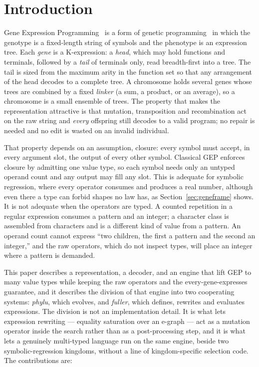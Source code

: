 \documentclass[sigconf,nonacm]{acmart}
\begin{document}
\maketitle

\section{Introduction}
\label{sec:intro}

Gene Expression Programming~\cite{ferreira2001gep} is a form of genetic
programming~\cite{koza1992gp} in which the genotype is a fixed-length string of
symbols and the phenotype is an expression tree. Each \emph{gene} is a
K-expression: a \emph{head}, which may hold functions and terminals, followed by
a \emph{tail} of terminals only, read breadth-first into a tree. The tail is
sized from the maximum arity in the function set so that any arrangement of the
head decodes to a complete tree. A chromosome holds several genes whose trees are
combined by a fixed \emph{linker} (a sum, a product, or an average), so a
chromosome is a small ensemble of trees. The property that makes the
representation attractive is that mutation, transposition and recombination act
on the raw string and \emph{every} offspring still decodes to a valid program; no
repair is needed and no edit is wasted on an invalid individual.

That property depends on an assumption, closure: every symbol must accept, in
every argument slot, the output of every other symbol. Classical GEP enforces
closure by admitting one value type, so each symbol needs only an untyped operand
count and any output may fill any slot. This is adequate for symbolic regression,
where every operator consumes and produces a real number, although even there a
type can forbid shapes no law has, as Section~\ref{sec:geneframe} shows. It is
not adequate when the operators are typed. A counted repetition in a regular expression consumes a
pattern and an integer; a character class is assembled from characters and is a
different kind of value from a pattern. An operand count cannot express ``two
children, the first a pattern and the second an integer,'' and the raw operators,
which do not inspect types, will place an integer where a pattern is demanded.

This paper describes a representation, a decoder, and an engine that lift GEP to
many value types while keeping the raw operators and the every-gene-expresses
guarantee, and it describes the division of that engine into two cooperating
systems: \emph{phylu}, which evolves, and \emph{fuller}, which defines,
rewrites and evaluates expressions. The division is not an implementation detail.
It is what lets expression rewriting --- equality saturation over an e-graph ---
act as a mutation operator inside the search rather than as a post-processing
step, and it is what lets a genuinely multi-typed language run on the same
engine, beside two symbolic-regression kingdoms, without a line of
kingdom-specific selection code. The contributions are:
\end{document}
